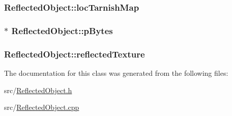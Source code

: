 \hypertarget{class_reflected_object_a7bd8030e15ac3f526d8b8eedd4a45b4e}{
\subsubsection[{loc\-Tarnish\-Map}]{ Reflected\-Object\-::loc\-Tarnish\-Map}}\label{class_reflected_object_a7bd8030e15ac3f526d8b8eedd4a45b4e}
\hypertarget{class_reflected_object_a89e421d06632f614f568b45220f2f53b}{
\subsubsection[{p\-Bytes}]{$\ast$ Reflected\-Object\-::p\-Bytes}}\label{class_reflected_object_a89e421d06632f614f568b45220f2f53b}
\hypertarget{class_reflected_object_a688cbd6ac7c044ec419f62401b3caaf5}{
\subsubsection[{reflected\-Texture}]{ Reflected\-Object\-::reflected\-Texture}}\label{class_reflected_object_a688cbd6ac7c044ec419f62401b3caaf5}


The documentation for this class was generated from the following files\-:\begin{DoxyCompactItemize}
\item 
src/\hyperlink{_reflected_object_8h}{Reflected\-Object.\-h}\item 
src/\hyperlink{_reflected_object_8cpp}{Reflected\-Object.\-cpp}\end{DoxyCompactItemize}
